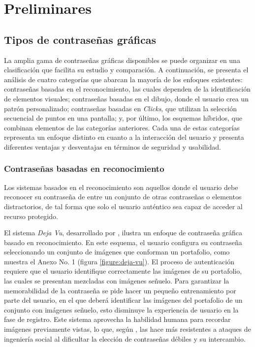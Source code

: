 \chapter{Preliminares}\label{chapter:state-of-the-art}
\section{Tipos de contraseñas gráficas}
La amplia gama de contraseñas gráficas disponibles se puede organizar en una clasificación que facilita su estudio y comparación. A continuación, se presenta el análisis de cuatro categorías que abarcan la mayoría de los enfoques existentes: contraseñas basadas en el reconocimiento, las cuales dependen de la identificación de elementos visuales; contraseñas basadas en el dibujo, donde el usuario crea un patrón personalizado; contraseñas basadas en \textit{Clicks}, que utilizan la selección secuencial de puntos en una pantalla; y, por último, los esquemas híbridos, que combinan elementos de las categorías anteriores. Cada una de estas categorías representa un enfoque distinto en cuanto a la interacción del usuario y presenta diferentes ventajas y desventajas en términos de seguridad y usabilidad.  
\subsection{Contraseñas basadas en reconocimiento}
Los sistemas basados en el reconocimiento son aquellos donde el usuario debe reconocer su contraseña de entre un conjunto de otras contraseñas o elementos distractorios, de tal forma que solo el usuario auténtico sea capaz de acceder al recurso protegido.

 
El sistema \textit{Deja Vu}, desarrollado por \cite{dhamija2000deja}, ilustra un enfoque de contraseña gráfica basado en reconocimiento. En este esquema, el usuario configura su contraseña seleccionando un conjunto de imágenes que conforman un portafolio, como muestra el Anexo No. 1 (figura \ref{figure:deja-vu}). El proceso de autenticación requiere que el usuario identifique correctamente las imágenes de su portafolio, las cuales se presentan mezcladas con imágenes señuelo. Para garantizar la memorabilidad de la contraseña se pide hacer un pequeño entrenamiento por parte del usuario, en el que deberá identificar las imágenes del portafolio de un conjunto con imágenes señuelo, esto disminuye la experiencia de usuario en la fase de registro. Este sistema aprovecha la habilidad humana para recordar imágenes previamente vistas, lo que, según \cite{dhamija2000deja}, las hace más resistentes a ataques de ingeniería social al dificultar la elección de contraseñas débiles y su intercambio.


